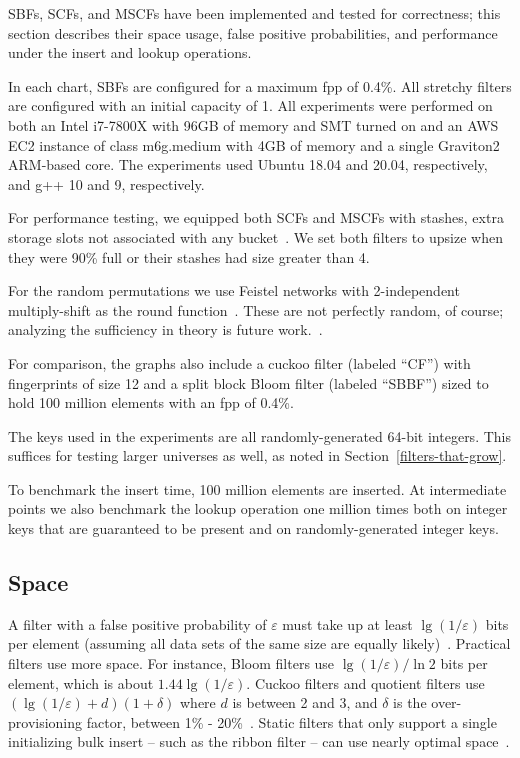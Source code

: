 \documentclass[letterpaper,twocolumn,10pt]{article}
\newcommand{\taffy}{stretchy}
\newcommand{\TBF}{SBF}
\newcommand{\TCF}{SCF}
\newcommand{\MTCF}{MSCF}
\newcommand{\taffy}{taffy}
\newcommand{\TBF}{TBF}
\newcommand{\TCF}{TCF}
\newcommand{\MTCF}{MTCF}
\begin{document}
\TBF{}s, \TCF{}s, and \MTCF{}s have been implemented and tested for correctness; this section describes their space usage, false positive probabilities, and performance under the insert and lookup operations.

In each chart, \TBF{}s are configured for a maximum fpp of 0.4\%.
All \taffy{} filters are configured with an initial capacity of 1. %
All experiments were performed on both an Intel i7-7800X with 96GB of memory and SMT turned on and an AWS EC2 instance of class m6g.medium with 4GB of memory and a single Graviton2 ARM-based core.
The experiments used Ubuntu 18.04 and 20.04, respectively, and g++ 10 and 9, respectively.

For performance testing, we equipped both \TCF{}s and \MTCF{}s with stashes, extra storage slots not associated with any bucket~\cite{stash}.
We set both filters to upsize when they were 90\% full or their stashes had size greater than 4.

For the random permutations we use Feistel networks with 2-independent multiply-shift as the round function~\cite{two-independent-multiply-shift}.
These are not perfectly random, of course; analyzing the sufficiency in theory is future work.~\cite{why-simple,backyard}.

For comparison, the graphs also include a cuckoo filter (labeled ``CF'') with fingerprints of size 12 and a split block Bloom filter (labeled ``SBBF'') sized to hold 100 million elements with an fpp of 0.4\%.

The keys used in the experiments are all randomly-generated 64-bit integers.
This suffices for testing larger universes as well, as noted in Section~\ref{filters-that-grow}.

To benchmark the insert time, 100 million elements are inserted.
At intermediate points we also benchmark the lookup operation one million times both on integer keys that are guaranteed to be present and on randomly-generated integer keys.

\subsection{Space}

A filter with a false positive probability of $\varepsilon$ must take up at least $\lg (1/\varepsilon)$ bits per element (assuming all data sets of the same size are equally likely)~\cite{lower-bound}.
Practical filters use more space.
For instance, Bloom filters use $\lg (1/\varepsilon)/\ln 2$ bits per element, which is about $1.44 \lg (1/\varepsilon)$.
Cuckoo filters and quotient filters use $(\lg (1/\varepsilon) + d) (1 + \delta)$ where $d$ is between 2 and 3, and $\delta$ is the over-provisioning factor, between 1\% - 20\%~\cite{cuckoo,quotient-filter,vector-quotient}.
Static filters that only support a single initializing bulk insert -- such as the ribbon filter -- can use nearly optimal space~\cite{ribbon}.
\end{document}
